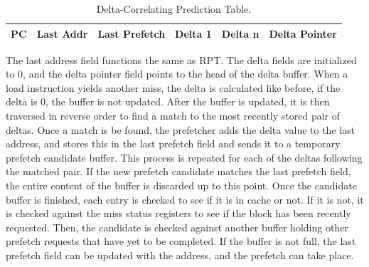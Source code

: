 \begin{table}[!htb]
\centering
\caption{Delta-Correlating Prediction Table.}
\label{tab:DCPT}
\begin{tabular}{ |c|c|c|c|c|c| } 
    \hline
    PC & Last Addr & Last Prefetch & Delta 1 & Delta n & Delta Pointer
    \\
    \hline
\end{tabular}
\end{table}

The last address field functions the same as RPT. The delta fields are initialized to 0, and the delta pointer field points to the head of the delta buffer. When a load instruction yields another miss, the delta is calculated like before, if the delta is 0, the buffer is not updated. After the buffer is updated, it is then traversed in reverse order to find a match to the most recently stored pair of deltas. Once a match is be found, the prefetcher adds the delta value to the last address, and stores this in the last prefetch field and sends it to a temporary prefetch candidate buffer. This process is repeated for each of the deltas following the matched pair. If the new prefetch candidate matches the last prefetch field, the entire content of the buffer is discarded up to this point.
Once the candidate buffer is finished, each entry is checked to see if it is in cache or not. If it is not, it is checked against the miss status registers to see if the block has been recently requested. Then, the candidate is checked against another buffer holding other prefetch requests that have yet to be completed. If the buffer is not full, the last prefetch field can be updated with the address, and the prefetch can take place.






